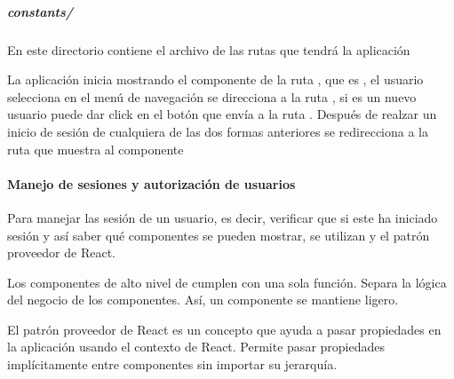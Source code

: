 \subparagraph{constants/}
\label{\detokenize{code_docs:constants}}
En este directorio contiene el archivo de las rutas que tendrá la aplicación

%
\begin{sphinxVerbatim}[commandchars=\\\{\}]
    
    
    
    
\end{sphinxVerbatim}

La aplicación inicia mostrando el componente de la ruta , que es
, el usuario selecciona  en el menú de navegación
se direcciona a la ruta , si es un nuevo usuario puede dar click
en el botón que envía a la ruta . Después de realzar un inicio de
sesión de cualquiera de las dos formas anteriores se redirecciona a la ruta
 que muestra al componente 


\paragraph{Manejo de sesiones y autorización de usuarios}
\label{\detokenize{code_docs:manejo-de-sesiones-y-autorizacion-de-usuarios}}
Para manejar las sesión de un usuario, es decir, verificar que si este ha
iniciado sesión y así saber qué componentes se pueden mostrar, se utilizan
 y el patrón proveedor de React.

Los componentes de alto nivel de cumplen con una sola función. Separa la lógica
del negocio de los componentes. Así, un componente se mantiene ligero.

El patrón proveedor de React es un concepto que ayuda a pasar propiedades
en la aplicación usando el contexto de React. Permite pasar propiedades
implícitamente entre componentes sin importar su jerarquía.

